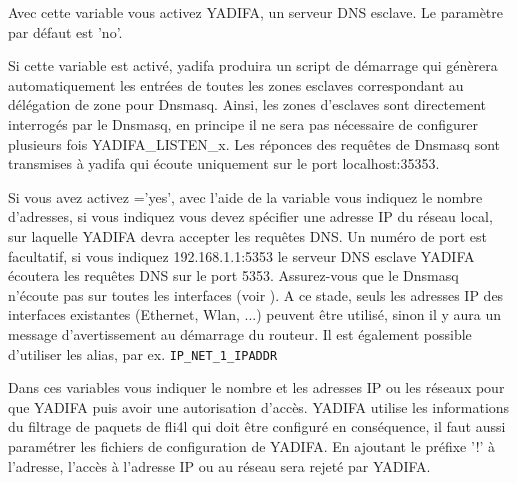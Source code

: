 \begin{description}


    Avec cette variable vous activez YADIFA, un serveur DNS esclave.
    Le paramètre par défaut est 'no'.


    Si cette variable est activé, yadifa produira un script de démarrage qui
    génèrera automatiquement les entrées de toutes les zones esclaves
    correspondant au délégation de zone pour Dnsmasq. Ainsi, les zones d'esclaves
    sont directement interrogés par le Dnsmasq, en principe il ne sera pas
    nécessaire de configurer plusieurs fois YADIFA\_LISTEN\_x. Les réponces des
    requêtes de Dnsmasq sont transmises à yadifa qui écoute uniquement
    sur le port localhost:35353.


    Si vous avez activez ='yes', avec l'aide de la variable
     vous indiquez le nombre d'adresses, si vous indiquez
     vous devez spécifier une adresse IP du réseau local,
    sur laquelle YADIFA devra accepter les requêtes DNS. Un numéro de port est
    facultatif, si vous indiquez 192.168.1.1:5353 le serveur DNS esclave YADIFA
    écoutera les requêtes DNS sur le port 5353. Assurez-vous que le Dnsmasq
    n'écoute pas sur toutes les interfaces (voir ).
    A ce stade, seuls les adresses IP des interfaces existantes (Ethernet, Wlan, ...)
    peuvent être utilisé, sinon il y aura un message d'avertissement au démarrage
    du routeur. Il est également possible d'utiliser les alias, par ex. \verb+IP_NET_1_IPADDR+


    Dans ces variables vous indiquer le nombre et les adresses IP ou les
    réseaux pour que YADIFA puis avoir une autorisation d'accès. YADIFA utilise
    les informations du filtrage de paquets de fli4l qui doit être configuré en
    conséquence, il faut aussi paramétrer les fichiers de configuration de YADIFA.
    En ajoutant le préfixe '!' à l'adresse, l'accès à l'adresse IP ou au réseau
    sera rejeté par YADIFA.


\end{description}
